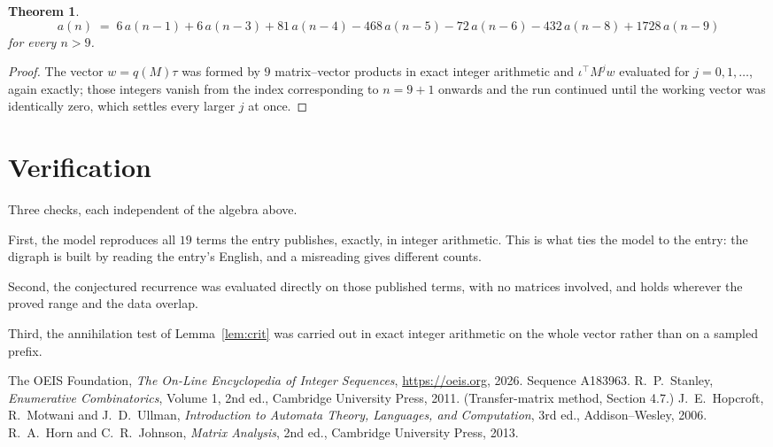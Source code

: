 \documentclass[11pt,a4paper]{article}
\theoremstyle{plain}
\newtheorem{theorem}{Theorem}
\theoremstyle{definition}
\begin{document}
\begin{theorem}
\[
a(n)\;=\;6\,a(n-1) + 6\,a(n-3) + 81\,a(n-4) - 468\,a(n-5) - 72\,a(n-6) - 432\,a(n-8) + 1728\,a(n-9)
\]
for every $n>9$.
\end{theorem}

\begin{proof}
The vector $w=q(M)\tau$ was formed by $9$ matrix--vector products in exact integer
arithmetic and $\iota^{\!\top}M^{j}w$ evaluated for $j=0,1,\dots$, again exactly; those
integers vanish from the index corresponding to $n=9+1$ onwards and the run continued
until the working vector was identically zero, which settles every larger $j$ at once.
\end{proof}

\section{Verification}

Three checks, each independent of the algebra above.

First, the model reproduces all $19$ terms the entry publishes, exactly, in integer
arithmetic. This is what ties the model to the entry: the digraph is built by reading the
entry's English, and a misreading gives different counts.

Second, the conjectured recurrence was evaluated directly on those published terms, with no
matrices involved, and holds wherever the proved range and the data overlap.

Third, the annihilation test of Lemma~\ref{lem:crit} was carried out in exact integer
arithmetic on the whole vector rather than on a sampled prefix.

\begin{thebibliography}{9}
 The OEIS Foundation, \emph{The On-Line Encyclopedia of Integer
Sequences}, \url{https://oeis.org}, 2026. Sequence A183963.
 R.~P.~Stanley, \emph{Enumerative Combinatorics}, Volume 1, 2nd ed.,
Cambridge University Press, 2011. (Transfer-matrix method, Section 4.7.)
 J.~E.~Hopcroft, R.~Motwani and J.~D.~Ullman, \emph{Introduction to Automata
Theory, Languages, and Computation}, 3rd ed., Addison--Wesley, 2006.
 R.~A.~Horn and C.~R.~Johnson, \emph{Matrix Analysis}, 2nd ed., Cambridge
University Press, 2013.
\end{thebibliography}
\end{document}
